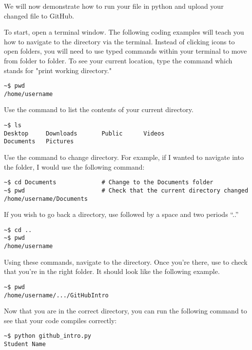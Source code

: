We will now demonstrate how to run your file in python and upload your changed file to GitHub.

To start, open a terminal window.
The following coding examples will teach you how to navigate to the  directory via the terminal.
Instead of clicking icons to open folders, you will need to use typed commands within your terminal to move from folder to folder.
To see your current location, type the command  which stands for "print working directory."

\begin{lstlisting}
~$ pwd
/home/username
\end{lstlisting}

Use the command  to list the contents of your current directory.

\begin{lstlisting}
~$ ls
Desktop		Downloads		Public 		Videos
Documents 	Pictures
\end{lstlisting}

Use the command  to change directory. For example, if I wanted to navigate into the  folder, I would use the following command:

\begin{lstlisting}
~$ cd Documents				# Change to the Documents folder
~$ pwd						# Check that the current directory changed
/home/username/Documents
\end{lstlisting}

If you wish to go back a directory, use  followed by a space and two periods ``{..}''

\begin{lstlisting}
~$ cd ..
~$ pwd
/home/username
\end{lstlisting}

Using these commands, navigate to the  directory.
Once you're there, use  to check that you're in the right folder.
It should look like the following example.

\begin{lstlisting}
~$ pwd
/home/username/.../GitHubIntro
\end{lstlisting}

Now that you are in the correct directory, you can run the following command to see that your code compiles correctly:

\begin{lstlisting}
~$ python github_intro.py
Student Name
\end{lstlisting}

